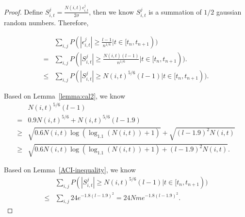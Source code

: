 \documentclass{article}
\begin{document}
\begin{proof}
Define $S_{i,t}^{j}=\frac{N(i,t)\epsilon_{i,t}^{j}}{2\sigma}$, then we know $S_{i,t}^{j}$ is a summation of $1/2$ gaussian random numbers. Therefore,

\begin{align}
&\sum_{i,j}P(|\epsilon_{i,t}^{j}|\geq \frac{l-1}{n^{1/6}}|t\in[t_n,t_{n+1})) \nonumber \\ 
=&\sum_{i,j}P(|S_{i,t}^{j}|\geq \frac{N(i,t)(l-1)}{n^{1/6}}|t\in[t_n,t_{n+1})). \nonumber \\
\leq &\sum_{i,j}P(|S_{i,t}^{j}|\geq N(i,t)^{5/6}(l-1)|t\in[t_n,t_{n+1})). \nonumber
\end{align}

Based on Lemma~\ref{lemma:cal2}, we know
\begin{align}
&N(i,t)^{5/6}(l-1) \nonumber \\
=& 0.9N(i,t)^{5/6} + N(i,t)^{5/6}(l-1.9) \nonumber \\
\geq & \sqrt{0.6N(i,t)\log(\log_{1.1}(N(i,t))+1)} + \sqrt{(l-1.9)^2 N(i,t)} \nonumber \\
\geq & \sqrt{0.6N(i,t)\log(\log_{1.1}(N(i,t))+1)+(l-1.9)^2 N(i,t)}. \nonumber
\end{align}

Based on Lemma~\ref{ACI-inequality}, we know
\begin{align}
&\sum_{i,j}P(|S_{i,t}^{j}|\geq N(i,t)^{5/6}(l-1)|t\in[t_n,t_{n+1})) \nonumber \\
\leq & \sum_{i,j}24e^{-1.8(l-1.9)^2} = 24Nme^{-1.8(l-1.9)^2}. \nonumber
\end{align}


\end{proof}
\end{document}
